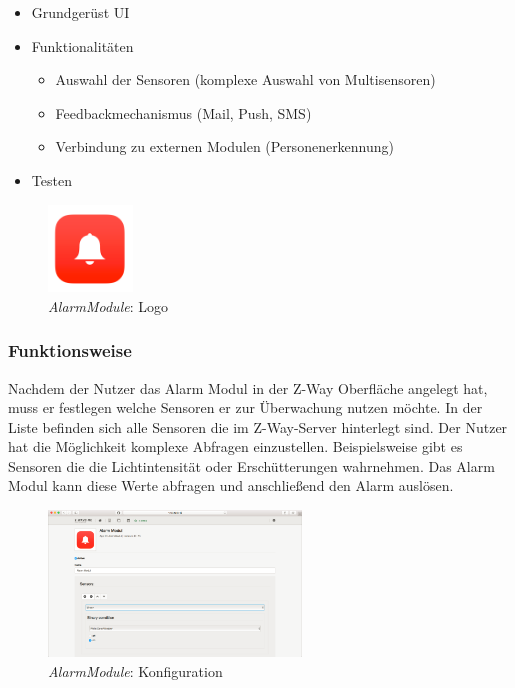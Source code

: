 \begin{itemize}
\item Grundgerüst UI
\item Funktionalitäten
	\begin{itemize}
		\item Auswahl der Sensoren (komplexe Auswahl von Multisensoren)
		\item Feedbackmechanismus (Mail, Push, SMS)
		\item Verbindung zu externen Modulen (Personenerkennung)
	\end{itemize}
\item Testen
\end{itemize}

\begin{figure}[h!]
	\centering
	\includegraphics[width=0.2\textwidth]{img/Modulkonzeption/AlarmModule1.png}
	\caption{\emph{AlarmModule}: Logo}
	\label{fig:alarmModule1}
\end{figure}

\subsubsection{Funktionsweise}
Nachdem der Nutzer das Alarm Modul in der Z-Way Oberfläche angelegt hat, muss er festlegen welche Sensoren er zur Überwachung nutzen möchte. In der Liste befinden sich alle Sensoren die im Z-Way-Server hinterlegt sind. Der Nutzer hat die Möglichkeit komplexe Abfragen einzustellen. Beispielsweise gibt es Sensoren die die Lichtintensität oder Erschütterungen wahrnehmen. Das Alarm Modul kann diese Werte abfragen und anschließend den Alarm auslösen.

\begin{figure}[h!]
	\centering
	\includegraphics[width=0.6\textwidth]{img/Modulkonzeption/AlarmModule2.png}
	\caption{\emph{AlarmModule}: Konfiguration}
	\label{fig:alarmModule2}
\end{figure}

